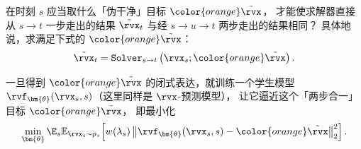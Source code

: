 \begin{question}
在时刻 $s$ 应当取什么「伪干净」目标 ${\color{orange}\tilde\rvx}$，
才能使求解器直接从 $s \to t$ 一步走出的结果 $\tilde\rvx_t$
与经 $s \to u \to t$ 两步走出的结果相同？
具体地说，求满足下式的 ${\color{orange}\tilde\rvx}$：
\[
\tilde\rvx_t = \mathtt{Solver}_{s\to t}\left(\rvx_s; {\color{orange}\tilde\rvx}\right).
\]
\end{question}


一旦得到 ${\color{orange}\tilde\rvx}$ 的闭式表达，就训练一个学生模型
$\rvf_{\bm{\theta}}(\rvx_s, s)$（这里同样是 $\rvx$-预测模型），
让它逼近这个「两步合一」目标 ${\color{orange}\tilde\rvx}$，
即最小化
\begin{align}\label{eq:pd-optimization}
\min_{\bm{\theta}} \E_s
\mathbb{E}_{\rvx_s\sim p_s}\!\left[w(\lambda_s)\,\big\|\rvf_{\bm{\theta}}(\rvx_s, s) - {\color{orange}\tilde\rvx}\big\|_2^2\right].
\end{align}


